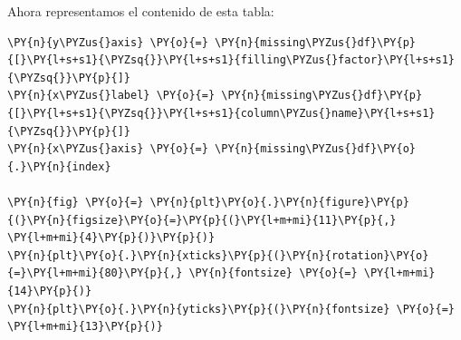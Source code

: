     Ahora representamos el contenido de esta tabla:

    \begin{tcolorbox}[breakable, size=fbox, boxrule=1pt, pad at break*=1mm,colback=cellbackground, colframe=cellborder]
\begin{Verbatim}[commandchars=\\\{\}]
\PY{n}{y\PYZus{}axis} \PY{o}{=} \PY{n}{missing\PYZus{}df}\PY{p}{[}\PY{l+s+s1}{\PYZsq{}}\PY{l+s+s1}{filling\PYZus{}factor}\PY{l+s+s1}{\PYZsq{}}\PY{p}{]} 
\PY{n}{x\PYZus{}label} \PY{o}{=} \PY{n}{missing\PYZus{}df}\PY{p}{[}\PY{l+s+s1}{\PYZsq{}}\PY{l+s+s1}{column\PYZus{}name}\PY{l+s+s1}{\PYZsq{}}\PY{p}{]}
\PY{n}{x\PYZus{}axis} \PY{o}{=} \PY{n}{missing\PYZus{}df}\PY{o}{.}\PY{n}{index}

\PY{n}{fig} \PY{o}{=} \PY{n}{plt}\PY{o}{.}\PY{n}{figure}\PY{p}{(}\PY{n}{figsize}\PY{o}{=}\PY{p}{(}\PY{l+m+mi}{11}\PY{p}{,} \PY{l+m+mi}{4}\PY{p}{)}\PY{p}{)}
\PY{n}{plt}\PY{o}{.}\PY{n}{xticks}\PY{p}{(}\PY{n}{rotation}\PY{o}{=}\PY{l+m+mi}{80}\PY{p}{,} \PY{n}{fontsize} \PY{o}{=} \PY{l+m+mi}{14}\PY{p}{)}
\PY{n}{plt}\PY{o}{.}\PY{n}{yticks}\PY{p}{(}\PY{n}{fontsize} \PY{o}{=} \PY{l+m+mi}{13}\PY{p}{)}


\end{Verbatim}
\end{tcolorbox}
